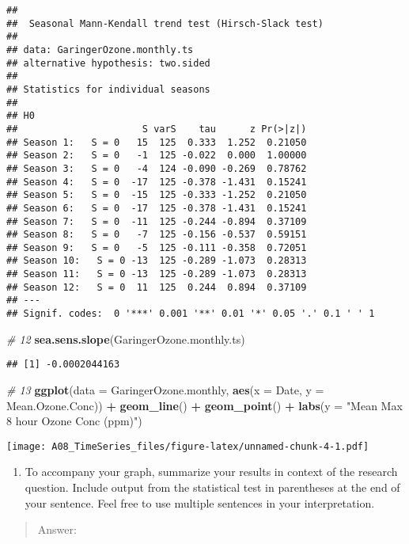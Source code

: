 \documentclass[]{article}
\newenvironment{Shaded}{\begin{snugshade}}{\end{snugshade}}
\newcommand{\CommentTok}[1]{\textcolor[rgb]{0.56,0.35,0.01}{\textit{#1}}}
\newcommand{\DataTypeTok}[1]{\textcolor[rgb]{0.13,0.29,0.53}{#1}}
\newcommand{\KeywordTok}[1]{\textcolor[rgb]{0.13,0.29,0.53}{\textbf{#1}}}
\newcommand{\NormalTok}[1]{#1}
\newcommand{\OperatorTok}[1]{\textcolor[rgb]{0.81,0.36,0.00}{\textbf{#1}}}
\newcommand{\StringTok}[1]{\textcolor[rgb]{0.31,0.60,0.02}{#1}}
\providecommand{\tightlist}{%
  \setlength{\itemsep}{0pt}\setlength{\parskip}{0pt}}
\begin{document}
\begin{verbatim}
## 
##  Seasonal Mann-Kendall trend test (Hirsch-Slack test)
## 
## data: GaringerOzone.monthly.ts
## alternative hypothesis: two.sided
## 
## Statistics for individual seasons
## 
## H0
##                      S varS    tau      z Pr(>|z|)  
## Season 1:   S = 0   15  125  0.333  1.252  0.21050  
## Season 2:   S = 0   -1  125 -0.022  0.000  1.00000  
## Season 3:   S = 0   -4  124 -0.090 -0.269  0.78762  
## Season 4:   S = 0  -17  125 -0.378 -1.431  0.15241  
## Season 5:   S = 0  -15  125 -0.333 -1.252  0.21050  
## Season 6:   S = 0  -17  125 -0.378 -1.431  0.15241  
## Season 7:   S = 0  -11  125 -0.244 -0.894  0.37109  
## Season 8:   S = 0   -7  125 -0.156 -0.537  0.59151  
## Season 9:   S = 0   -5  125 -0.111 -0.358  0.72051  
## Season 10:   S = 0 -13  125 -0.289 -1.073  0.28313  
## Season 11:   S = 0 -13  125 -0.289 -1.073  0.28313  
## Season 12:   S = 0  11  125  0.244  0.894  0.37109  
## ---
## Signif. codes:  0 '***' 0.001 '**' 0.01 '*' 0.05 '.' 0.1 ' ' 1
\end{verbatim}

\begin{Shaded}
\begin{Highlighting}[]
\CommentTok{# 12}
\KeywordTok{sea.sens.slope}\NormalTok{(GaringerOzone.monthly.ts)}
\end{Highlighting}
\end{Shaded}

\begin{verbatim}
## [1] -0.0002044163
\end{verbatim}

\begin{Shaded}
\begin{Highlighting}[]
\CommentTok{# 13}
\KeywordTok{ggplot}\NormalTok{(}\DataTypeTok{data =}\NormalTok{ GaringerOzone.monthly, }
       \KeywordTok{aes}\NormalTok{(}\DataTypeTok{x =}\NormalTok{ Date, }\DataTypeTok{y =}\NormalTok{ Mean.Ozone.Conc)) }\OperatorTok{+}
\StringTok{  }\KeywordTok{geom_line}\NormalTok{() }\OperatorTok{+}
\StringTok{  }\KeywordTok{geom_point}\NormalTok{() }\OperatorTok{+}
\StringTok{  }\KeywordTok{labs}\NormalTok{(}\DataTypeTok{y =} \StringTok{"Mean Max 8 hour Ozone Conc (ppm)"}\NormalTok{)}
\end{Highlighting}
\end{Shaded}

\texttt{[image: A08\_TimeSeries\_files/figure-latex/unnamed-chunk-4-1.pdf]}

\begin{enumerate}
\def\labelenumi{\arabic{enumi}.}
\setcounter{enumi}{13}
\tightlist
\item
  To accompany your graph, summarize your results in context of the
  research question. Include output from the statistical test in
  parentheses at the end of your sentence. Feel free to use multiple
  sentences in your interpretation.
\end{enumerate}

\begin{quote}
Answer:
\end{quote}
\end{document}
